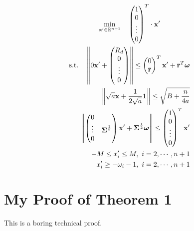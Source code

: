 \documentclass[12pt]{ftec2101}
\newcommand{\vect}[1]{\mathbf{#1}}
\begin{document}
\begin{gather}
    \min_{\vect{x'} \in \mathbb{R}^{n+1}} \quad \begin{pmatrix}
        1 \\
        0 \\
        \vdots \\
        0
    \end{pmatrix}^T
    \cdot \vect{x'}\\
    \begin{aligned}
    \textup{s.t.} \quad  \left \Vert 0 \vect{x'} + 
    \begin{pmatrix}
        R_d\\
        0\\
        \vdots\\
        0
    \end{pmatrix} \right \Vert \leq
    \begin{pmatrix}
        0\\
        \bar{\vect{r}}
    \end{pmatrix}^T \vect{x'} + \bar{\vect{r}}^T \boldsymbol{\omega}\\
    \left \Vert \sqrt{a} \vect{x} + \frac{1}{2\sqrt{a}} \vect{1}\right \Vert \leq \sqrt{B+\frac{n}{4a}}\\
    \left \Vert
    \begin{pmatrix}
        0 & \\
        \vdots & \boldsymbol{\Sigma}^{\frac{1}{2}}\\
        0 & 
    \end{pmatrix} \vect{x'} + \boldsymbol{\Sigma}^{\frac{1}{2}} \boldsymbol{\omega} \right \Vert \leq
    \begin{pmatrix}
        1 \\
        0 \\
        \vdots \\
        0
    \end{pmatrix}^T \vect{x'}\\
    -M \leq x'_i \leq M,\ i=2,\cdots,n+1 \\
    x'_i \geq - \omega_i - 1,\ i=2,\cdots,n+1
    \end{aligned}
\end{gather}


\appendix

\section{My Proof of Theorem 1}

This is a boring technical proof.
 
\end{document}
